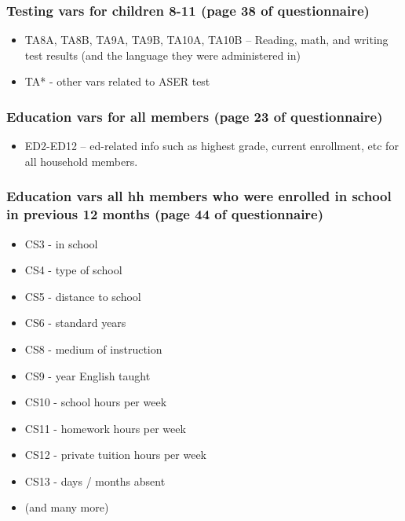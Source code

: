 \documentclass[
]{article}
\providecommand{\tightlist}{%
  \setlength{\itemsep}{0pt}\setlength{\parskip}{0pt}}
\begin{document}
\hypertarget{testing-vars-for-children-8-11-page-38-of-questionnaire}{%
\subsubsection{Testing vars for children 8-11 (page 38 of
questionnaire)}\label{testing-vars-for-children-8-11-page-38-of-questionnaire}}

\begin{itemize}
\tightlist
\item
  TA8A, TA8B, TA9A, TA9B, TA10A, TA10B -- Reading, math, and writing
  test results (and the language they were administered in)
\item
  TA* - other vars related to ASER test
\end{itemize}

\hypertarget{education-vars-for-all-members-page-23-of-questionnaire}{%
\subsubsection{Education vars for all members (page 23 of
questionnaire)}\label{education-vars-for-all-members-page-23-of-questionnaire}}

\begin{itemize}
\tightlist
\item
  ED2-ED12 -- ed-related info such as highest grade, current enrollment,
  etc for all household members.
\end{itemize}

\hypertarget{education-vars-all-hh-members-who-were-enrolled-in-school-in-previous-12-months-page-44-of-questionnaire}{%
\subsubsection{Education vars all hh members who were enrolled in school
in previous 12 months (page 44 of
questionnaire)}\label{education-vars-all-hh-members-who-were-enrolled-in-school-in-previous-12-months-page-44-of-questionnaire}}

\begin{itemize}
\tightlist
\item
  CS3 - in school
\item
  CS4 - type of school
\item
  CS5 - distance to school
\item
  CS6 - standard years
\item
  CS8 - medium of instruction
\item
  CS9 - year English taught
\item
  CS10 - school hours per week
\item
  CS11 - homework hours per week
\item
  CS12 - private tuition hours per week
\item
  CS13 - days / months absent
\item
  (and many more)
\end{itemize}
\end{document}
